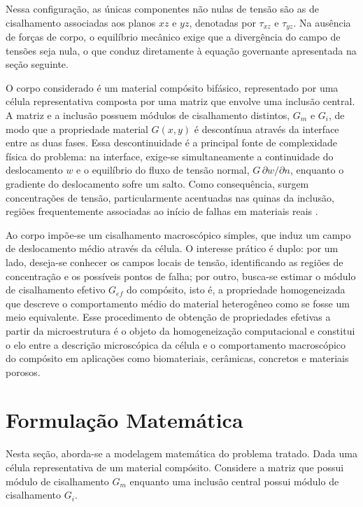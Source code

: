 \documentclass[brazil]{TCAM} %
\begin{document}
Nessa configuração, as únicas componentes não nulas de tensão são as de cisalhamento associadas aos planos $xz$ e $yz$, denotadas por $\tau_{xz}$ e $\tau_{yz}$. Na ausência de forças de corpo, o equilíbrio mecânico exige que a divergência do campo de tensões seja nula, o que conduz diretamente à equação governante apresentada na seção seguinte.

O corpo considerado é um material compósito bifásico, representado por uma célula representativa composta por uma matriz que envolve uma inclusão central. A matriz e a inclusão possuem módulos de cisalhamento distintos, $G_m$ e $G_i$, de modo que a propriedade material $G(x,y)$ é descontínua através da interface entre as duas fases. Essa descontinuidade é a principal fonte de complexidade física do problema: na interface, exige-se simultaneamente a continuidade do deslocamento $w$ e o equilíbrio do fluxo de tensão normal, $G\,\partial w/\partial n$, enquanto o gradiente do deslocamento sofre um salto. Como consequência, surgem concentrações de tensão, particularmente acentuadas nas quinas da inclusão, regiões frequentemente associadas ao início de falhas em materiais reais \cite{kohno1995singularities}.

Ao corpo impõe-se um cisalhamento macroscópico simples, que induz um campo de deslocamento médio através da célula. O interesse prático é duplo: por um lado, deseja-se conhecer os campos locais de tensão, identificando as regiões de concentração e os possíveis pontos de falha; por outro, busca-se estimar o módulo de cisalhamento efetivo $G_{ef}$ do compósito, isto é, a propriedade homogeneizada que descreve o comportamento médio do material heterogêneo como se fosse um meio equivalente. Esse procedimento de obtenção de propriedades efetivas a partir da microestrutura é o objeto da homogeneização computacional \cite{geers2010multiscale,torquato2002random,moulinec1998numerical} e constitui o elo entre a descrição microscópica da célula e o comportamento macroscópico do compósito em aplicações como biomateriais, cerâmicas, concretos e materiais porosos.


\section{Formulação Matemática}
Nesta seção, aborda-se a modelagem matemática do problema tratado.
Dada uma célula representativa de um material compósito. Considere a matriz que possui módulo de cisalhamento $G_m$ enquanto uma inclusão central possui módulo de cisalhamento $G_i$.
\end{document}
